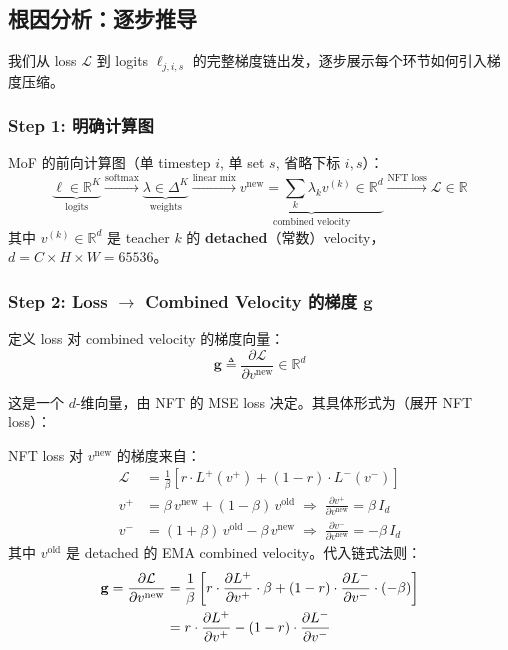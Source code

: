 \documentclass[11pt,a4paper]{article}
\newcommand{\loss}{\mathcal{L}}
\newcommand{\R}{\mathbb{R}}
\theoremstyle{definition}
\begin{document}
\subsection{根因分析：逐步推导}

我们从 loss $\loss$ 到 logits $\ell_{j,i,s}$ 的完整梯度链出发，逐步展示每个环节如何引入梯度压缩。

\subsubsection{Step 1: 明确计算图}

MoF 的前向计算图（单 timestep $i$, 单 set $s$, 省略下标 $i,s$）：
\begin{equation}
\underbrace{\ell \in \R^K}_{\text{logits}} \xrightarrow{\text{softmax}} \underbrace{\lambda \in \Delta^K}_{\text{weights}} \xrightarrow{\text{linear mix}} \underbrace{v^{\mathrm{new}} = \sum_k \lambda_k v^{(k)} \in \R^d}_{\text{combined velocity}} \xrightarrow{\text{NFT loss}} \loss \in \R
\end{equation}
其中 $v^{(k)} \in \R^d$ 是 teacher $k$ 的 \textbf{detached}（常数）velocity，$d = C \times H \times W = 65536$。

\subsubsection{Step 2: Loss $\to$ Combined Velocity 的梯度 $\mathbf{g}$}

定义 loss 对 combined velocity 的梯度向量：
\begin{equation}
\mathbf{g} \triangleq \frac{\partial \loss}{\partial v^{\mathrm{new}}} \in \R^d
\end{equation}

这是一个 $d$-维向量，由 NFT 的 MSE loss 决定。其具体形式为（展开 NFT loss）：

NFT loss 对 $v^{\mathrm{new}}$ 的梯度来自：
\begin{align}
\loss &= \frac{1}{\beta}\left[r \cdot L^+(v^+) + (1-r) \cdot L^-(v^-)\right] \\
v^+ &= \beta\, v^{\mathrm{new}} + (1-\beta)\, v^{\mathrm{old}} \;\Rightarrow\; \frac{\partial v^+}{\partial v^{\mathrm{new}}} = \beta\, I_d \\
v^- &= (1+\beta)\, v^{\mathrm{old}} - \beta\, v^{\mathrm{new}} \;\Rightarrow\; \frac{\partial v^-}{\partial v^{\mathrm{new}}} = -\beta\, I_d
\end{align}
其中 $v^{\mathrm{old}}$ 是 detached 的 EMA combined velocity。代入链式法则：
\begin{align}
\mathbf{g} = \frac{\partial \loss}{\partial v^{\mathrm{new}}} &= \frac{1}{\beta}\left[r \cdot \frac{\partial L^+}{\partial v^+} \cdot \beta + (1-r) \cdot \frac{\partial L^-}{\partial v^-} \cdot (-\beta)\right] \notag \\
&= r \cdot \frac{\partial L^+}{\partial v^+} - (1-r) \cdot \frac{\partial L^-}{\partial v^-}
\label{eq:g_beta_cancels}
\end{align}
\end{document}

